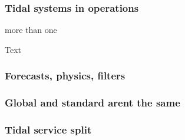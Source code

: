 \begin{frame}
\frametitle{Tidal systems in operations}
\begin{minipage}{0.45\textwidth}
    more than one
\end{minipage}
\hfill
\begin{minipage}{0.45\textwidth}
    Text
\end{minipage}
\end{frame}
\begin{frame}
\frametitle{Forecasts, physics, filters}
\end{frame}
\begin{frame}
\frametitle{Global and standard arent the same}
\end{frame}
\begin{frame}
\frametitle{Tidal service split}
\end{frame}